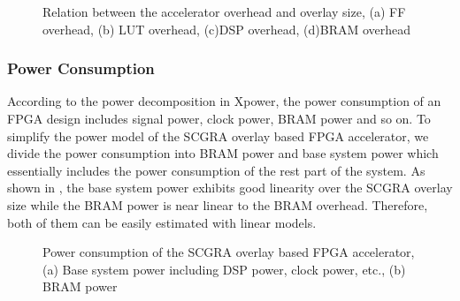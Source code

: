 \begin{figure}[tb]
    \centering
    \hfill
    \caption{Relation between the accelerator overhead and overlay size, 
    (a) FF overhead, (b) LUT overhead, (c)DSP overhead, (d)BRAM overhead}
    \label{fig:SCGRA-Overhead}
\end{figure}


\subsubsection{Power Consumption}
According to the power decomposition in Xpower, the power consumption 
of an FPGA design includes signal power, clock power, BRAM power and so on. 
To simplify the power model of the SCGRA overlay based FPGA accelerator, 
we divide the power consumption into BRAM power and base system 
power which essentially includes the power consumption of the rest part of the system. 
As shown in , the base system power exhibits good linearity 
over the SCGRA overlay size while the BRAM power is near linear to 
the BRAM overhead. Therefore, both of them can be easily estimated with linear models. 

\begin{figure}[tb]
    \centering
    \caption{Power consumption of the SCGRA overlay based FPGA accelerator, 
    (a) Base system power including DSP power, clock power, etc., (b) BRAM power}
    \label{fig:SCGRA-Power}
\end{figure}


